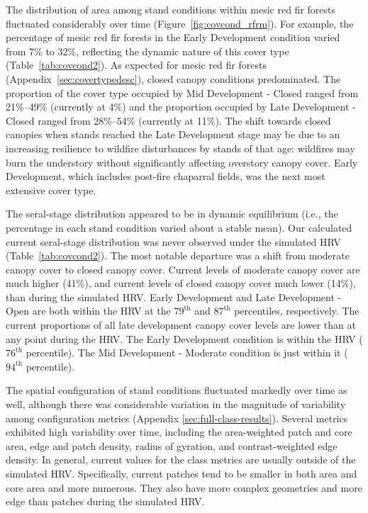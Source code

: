 The distribution of area among stand conditions within mesic red fir forests fluctuated considerably over time (Figure~\ref{fig:covcond_rfrm}). For example, the percentage of mesic red fir forests in the Early Development condition varied from 7\% to 32\%, reflecting the dynamic nature of this cover type (Table~\ref{tab:covcond2}). As expected for mesic red fir forests (Appendix~\ref{sec:covertypedesc}), closed canopy conditions predominated. The proportion of the cover type occupied by Mid Development - Closed ranged from 21\%--49\% (currently at 4\%) and the proportion occupied by Late Development - Closed ranged from 28\%--54\% (currently at 11\%). The shift towards closed canopies when stands reached the Late Development stage may be due to an increasing resilience to wildfire disturbances by stands of that age: wildfires may burn the understory without significantly affecting overstory canopy cover. Early Development, which includes post-fire chaparral fields, was the next most extensive cover type.

The seral-stage distribution appeared to be in dynamic equilibrium (i.e., the percentage in each stand condition varied about a stable mean). Our calculated current seral-stage distribution was never observed under the simulated HRV (Table~\ref{tab:covcond2}). The most notable departure was a shift from moderate canopy cover to closed canopy cover. Current levels of moderate canopy cover are much higher (41\%), and current levels of closed canopy cover much lower (14\%), than during the simulated HRV. Early Development and Late Development - Open are both within the HRV at the $79^{\text{th}}$ and $87^{\text{th}}$ percentiles, respectively. The current proportions of all late development canopy cover levels are lower than at any point during the HRV.  The Early Development condition is within the HRV ($76^{\text{th}}$ percentile). The Mid Development - Moderate condition is just within it ($94^{\text{th}}$ percentile).

The spatial configuration of stand conditions fluctuated markedly over time as well, although there was considerable variation in the magnitude of variability among configuration metrics (Appendix \ref{sec:full-class-results}). Several metrics exhibited high variability over time, including the area-weighted patch and core area, edge and patch density, radius of gyration, and contrast-weighted edge density. In general, current values for the class metrics are usually outside of the simulated HRV. Specifically, current patches tend to be smaller in both area and core area and more numerous. They also have more complex geometries and more edge than patches during the simulated HRV.

